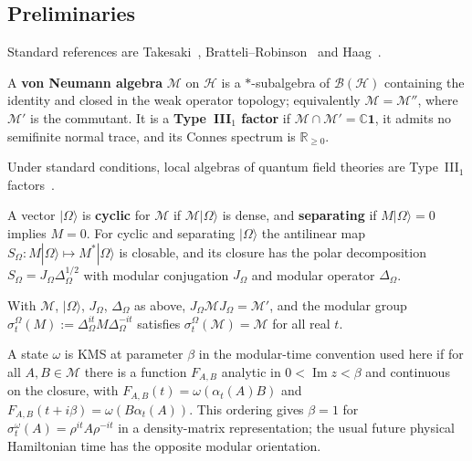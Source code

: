 \subsection{Preliminaries}
\label{sec:modular-prelim}

Standard references are Takesaki~\cite{Takesaki2003}, Bratteli--Robinson~\cite{BratteliRobinson1997} and Haag~\cite{Haag1996}.

\begin{definition}
A \textbf{von Neumann algebra} $\mathcal{M}$ on $\mathcal{H}$ is a $*$-subalgebra of $\mathcal{B}(\mathcal{H})$ containing the identity and closed in the weak operator topology; equivalently $\mathcal{M} = \mathcal{M}''$, where $\mathcal{M}'$ is the commutant. It is a \textbf{Type~III$_1$ factor} if $\mathcal{M} \cap \mathcal{M}' = \mathbb{C} \mathbf{1}$, it admits no semifinite normal trace, and its Connes spectrum is $\mathbb{R}_{\geq 0}$.
\end{definition}

Under standard conditions, local algebras of quantum field theories are Type~III$_1$ factors~\cite{Haag1996, Yngvason2005}.

A vector $|\Omega\rangle$ is \textbf{cyclic} for $\mathcal{M}$ if $\mathcal{M}|\Omega\rangle$ is dense, and \textbf{separating} if $M|\Omega\rangle = 0$ implies $M = 0$. For cyclic and separating $|\Omega\rangle$ the antilinear map $S_\Omega : M|\Omega\rangle \mapsto M^*|\Omega\rangle$ is closable, and its closure has the polar decomposition $S_\Omega = J_\Omega \Delta_\Omega^{1/2}$ with modular conjugation $J_\Omega$ and modular operator $\Delta_\Omega$.

\begin{theorem}
\label{thm:TT}
With $\mathcal M$, $|\Omega\rangle$, $J_\Omega$, $\Delta_\Omega$ as above, $J_\Omega \mathcal{M} J_\Omega = \mathcal{M}'$, and the modular group $\sigma_t^\Omega(M) := \Delta_\Omega^{it} M \Delta_\Omega^{-it}$ satisfies $\sigma_t^\Omega(\mathcal{M}) = \mathcal{M}$ for all real $t$.
\end{theorem}

A state $\omega$ is KMS at parameter $\beta$ in the modular-time convention used here
if for all $A,B\in\mathcal M$ there is a function $F_{A,B}$ analytic in
$0<\operatorname{Im}z<\beta$ and continuous on the closure, with
$F_{A,B}(t)=\omega(\alpha_t(A)B)$ and
$F_{A,B}(t+i\beta)=\omega(B\alpha_t(A))$. This ordering gives $\beta=1$ for
$\sigma_t^\omega(A)=\rho^{it}A\rho^{-it}$ in a density-matrix representation;
the usual future physical Hamiltonian time has the opposite modular orientation.

